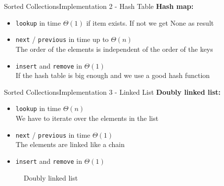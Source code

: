
\begin{frame}{Sorted Collections}{Implementation 2 - Hash Table}
  \textbf{Hash map:}
  \begin{itemize}
    \item
      {\color{Mittel-Blau}\texttt{lookup}} in time $\Theta(1)$ if item exists.
      If not we get {\color{Mittel-Blau}None} as result
    \item
      {\color{Mittel-Blau}\texttt{next}} /
      {\color{Mittel-Blau}\texttt{previous}} in time up to $\Theta(n)$\\
      The order of the elements is independent of the order of the keys
    \item
      {\color{Mittel-Blau}\texttt{insert}} and
      {\color{Mittel-Blau}\texttt{remove}} in $\Theta(1)$\\
      If the hash table is big enough and we use a good hash function
  \end{itemize}
\end{frame}


\begin{frame}{Sorted Collections}{Implementation 3 - Linked List}
  \textbf{Doubly linked list:}
  \begin{itemize}
    \item
      {\color{Mittel-Blau}\texttt{lookup}} in time $\Theta(n)$\\
      We have to iterate over the elements in the list
    \item
      {\color{Mittel-Blau}\texttt{next}} /
      {\color{Mittel-Blau}\texttt{previous}} in time $\Theta(1)$\\
      The elements are linked like a chain
    \item
      {\color{Mittel-Blau}\texttt{insert}} and
      {\color{Mittel-Blau}\texttt{remove}} in $\Theta(1)$
  \end{itemize}
  \begin{figure}
    
    \caption{Doubly linked list}
    \label{fig:sorted_collections:impl_linked_list}
  \end{figure}
\end{frame}